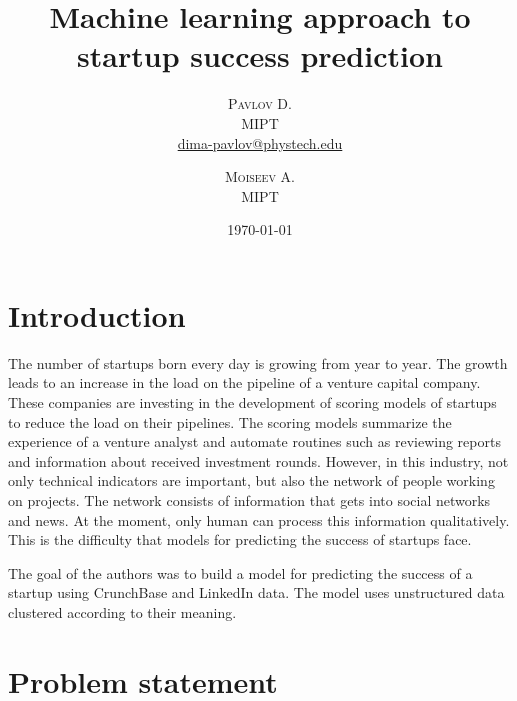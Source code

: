 \documentclass[12pt]{article}
\title{\textbf{\Huge{Machine learning approach to startup success prediction}}}
\author{%
\textsc{Pavlov D.} \\[1ex] 
\normalsize MIPT\\ 
\normalsize \href{mailto:dima-pavlov@phystech.edu}{dima-pavlov@phystech.edu}
\and 
\textsc{Moiseev A.} \\[1ex] 
\normalsize MIPT
}
\date{\today}
\theoremstyle{plain}
\theoremstyle{definition}
\begin{document}
\maketitle

\clearpage

\section{Introduction}



The number of startups born every day is growing from year to year. 
The growth leads to an increase in the load on the pipeline of a venture capital company. 
These companies are investing in the development of scoring models of startups to reduce the load on their pipelines. 
The scoring models summarize the experience of a venture analyst and automate routines such as reviewing reports and information about received investment rounds. %
However, in this industry, not only technical indicators are important, but also the network of people working on projects. 
The network consists of information that gets into social networks and news. 
At the moment, only human can process this information qualitatively. 
This is the difficulty that models for predicting the success of startups face. 

The goal of the authors was to build a model for predicting the success of a startup using CrunchBase and LinkedIn data. 
The model uses unstructured data clustered according to their meaning.

\section{Problem statement}

\end{document}

